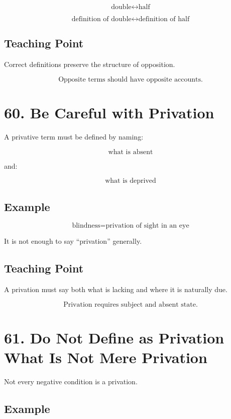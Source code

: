 \documentclass[12pt]{article}
\begin{document}
\[
\text{double} \leftrightarrow \text{half}
\]

\[
\text{definition of double} \leftrightarrow \text{definition of half}
\]

\subsection*{Teaching Point}

Correct definitions preserve the structure of opposition.

\[
\boxed{
\text{Opposite terms should have opposite accounts.}
}
\]

\section*{60. Be Careful with Privation}

A privative term must be defined by naming:

\[
\text{what is absent}
\]

and:

\[
\text{what is deprived}
\]

\subsection*{Example}

\[
\text{blindness} = \text{privation of sight in an eye}
\]

It is not enough to say ``privation'' generally.

\subsection*{Teaching Point}

A privation must say both what is lacking and where it is naturally due.

\[
\boxed{
\text{Privation requires subject and absent state.}
}
\]

\section*{61. Do Not Define as Privation What Is Not Mere Privation}

Not every negative condition is a privation.

\subsection*{Example}
\end{document}
